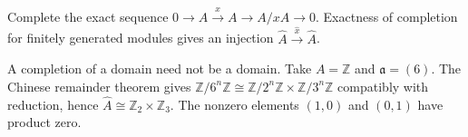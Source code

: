 Complete the exact sequence $0\to A\xrightarrow{x}A\to A/xA\to0$. Exactness of completion for finitely generated modules gives an injection $\widehat A\xrightarrow{\widehat x}\widehat A$.

A completion of a domain need not be a domain. Take $A=\mathbb{Z}$ and $\mathfrak{a}=(6)$. The Chinese remainder theorem gives $\mathbb{Z}/6^n\mathbb{Z}\cong\mathbb{Z}/2^n\mathbb{Z}\times\mathbb{Z}/3^n\mathbb{Z}$ compatibly with reduction, hence $\widehat A\cong\mathbb{Z}_2\times\mathbb{Z}_3$. The nonzero elements $(1,0)$ and $(0,1)$ have product zero.
